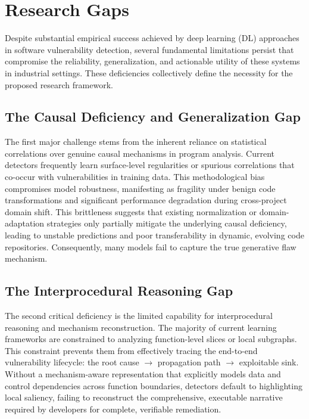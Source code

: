 \documentclass{buthesis}
\begin{document}
\section{Research Gaps}

Despite substantial empirical success achieved by deep learning (DL) approaches in software vulnerability detection, several fundamental limitations persist that compromise the reliability, generalization, and actionable utility of these systems in industrial settings. These deficiencies collectively define the necessity for the proposed research framework.

\subsection{The Causal Deficiency and Generalization Gap}
The first major challenge stems from the inherent reliance on statistical correlations over genuine causal mechanisms in program analysis. Current detectors frequently learn surface-level regularities or spurious correlations that co-occur with vulnerabilities in training data. This methodological bias compromises model robustness, manifesting as fragility under benign code transformations and significant performance degradation during cross-project domain shift. This brittleness suggests that existing normalization or domain-adaptation strategies only partially mitigate the underlying causal deficiency, leading to unstable predictions and poor transferability in dynamic, evolving code repositories. Consequently, many models fail to capture the true generative flaw mechanism.

\subsection{The Interprocedural Reasoning Gap}
The second critical deficiency is the limited capability for interprocedural reasoning and mechanism reconstruction. The majority of current learning frameworks are constrained to analyzing function-level slices or local subgraphs. This constraint prevents them from effectively tracing the end-to-end vulnerability lifecycle: the root cause $\rightarrow$ propagation path $\rightarrow$ exploitable sink. Without a mechanism-aware representation that explicitly models data and control dependencies across function boundaries, detectors default to highlighting local saliency, failing to reconstruct the comprehensive, executable narrative required by developers for complete, verifiable remediation.
\end{document}
